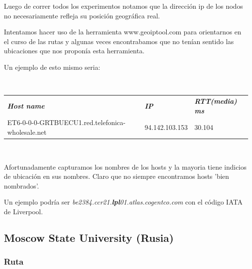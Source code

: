 Luego de correr todos los experimentos notamos que la direcci\'on ip de los nodos
no necesariamente refleja su posici\'on geogr\'afica real.

Intentamos hacer uso de la herramienta www.geoiptool.com para orientarnos en 
el curso de las rutas y algunas veces encontrabamos que no ten\'ian sentido las 
ubicaciones que nos propon\'ia esta herramienta.

Un ejemplo de esto mismo seria:

~

\begin{tabular}{lll}
	\textit{\textbf{Host name}}	&	\textit{\textbf{IP}}	&	\textit{\textbf{RTT(media) ms}}	\\
	ET6-0-0-0-GRTBUECU1.red.telefonica-wholesale.net	&	94.142.103.153	&	30.104	\\
\end{tabular}

~

Afortunadamente capturamos los nombres de los hosts y la mayoria tiene indicios de ubicaci\'on en sus
nombres. Claro que no siempre encontramos hosts 'bien nombrados'.

Un ejemplo podr\'ia ser \emph{be2384.ccr21.\textbf{lpl}01.atlas.cogentco.com} con el c\'odigo IATA de 
Liverpool.

\subsection{Moscow State University (Rusia)}

\subsubsection{Ruta}

~

